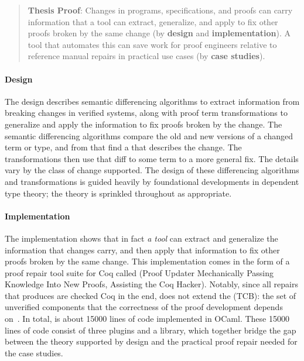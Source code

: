 \begin{quote}
\textbf{Thesis Proof}: Changes in programs, specifications, and proofs can carry information that a tool can extract, generalize, and apply to fix other proofs broken by the same change (by \textbf{design} and \textbf{implementation}). A tool that automates this can save work for proof engineers relative to reference manual repairs in practical use cases (by \textbf{case studies}).
\end{quote}

\paragraph{Design}
The design describes semantic differencing algorithms to extract information from breaking changes in verified systems,
along with proof term transformations to generalize and apply the information to fix proofs broken by the change.
The semantic differencing algorithms compare the old and new versions of a changed term or type,
and from that find a  that describes the change.
The transformations then use that diff to  some term to a more general fix.
The details vary by the class of change supported.
The design of these differencing algorithms and transformations is guided heavily by foundational developments in dependent type theory;
the theory is sprinkled throughout as appropriate.

\paragraph{Implementation}
The implementation shows that in fact \textit{a tool} can extract and generalize the information that changes carry,
and then apply that information to fix other proofs broken by the same change.
This implementation comes in the form of a proof repair tool suite for Coq called \intro{\sysnamelong} (Proof Updater Mechanically Passing Knowledge Into New Proofs, Assisting the Coq Hacker).
Notably, since all repairs that \sysnamelong produces are checked Coq in the end, \sysnamelong does not extend the  (TCB):
the set of unverified components that the correctness of the proof development depends on~\cite{PGL-045}.
In total, \sysnamelong is about 15000 lines of code implemented in OCaml.
These 15000 lines of code consist of three plugins and a library,
which together bridge the gap between the theory supported by design and the practical proof repair needed for the case studies.


